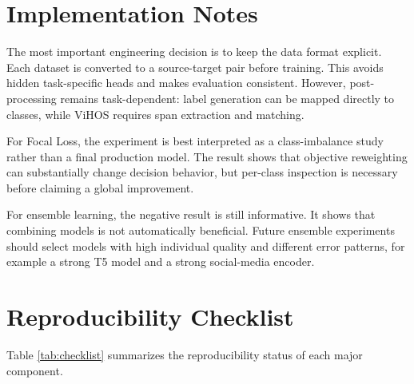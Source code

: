 \documentclass[journal]{IEEEtran}
\begin{document}
\begin{table}[!h]
\centering
\caption{Key result files used by this report.}
\label{tab:files}
\end{table}

\section{Implementation Notes}
The most important engineering decision is to keep the data format explicit. Each dataset is converted to a source-target pair before training. This avoids hidden task-specific heads and makes evaluation consistent. However, post-processing remains task-dependent: label generation can be mapped directly to classes, while ViHOS requires span extraction and matching.

For Focal Loss, the experiment is best interpreted as a class-imbalance study rather than a final production model. The result shows that objective reweighting can substantially change decision behavior, but per-class inspection is necessary before claiming a global improvement.

For ensemble learning, the negative result is still informative. It shows that combining models is not automatically beneficial. Future ensemble experiments should select models with high individual quality and different error patterns, for example a strong T5 model and a strong social-media encoder.

\section{Reproducibility Checklist}
Table \ref{tab:checklist} summarizes the reproducibility status of each major component.
\end{document}
